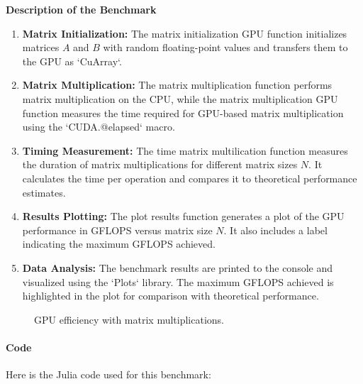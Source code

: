 \begin{center}
   \textbf{Description of the Benchmark}   
\end{center}

\begin{enumerate}
   \item \textbf{Matrix Initialization:} The matrix initialization GPU function initializes matrices \(A\) and \(B\) with random floating-point values and transfers them to the GPU as `CuArray`.
   \item \textbf{Matrix Multiplication:} The matrix multiplication function performs matrix multiplication on the CPU, while the matrix multiplication GPU function measures the time required for GPU-based matrix multiplication using the `CUDA.@elapsed` macro.
   \item \textbf{Timing Measurement:} The time matrix multilication function measures the duration of matrix multiplications for different matrix sizes \(N\). It calculates the time per operation and compares it to theoretical performance estimates.
   \item \textbf{Results Plotting:} The plot results function generates a plot of the GPU performance in GFLOPS versus matrix size \(N\). It also includes a label indicating the maximum GFLOPS achieved.
   \item \textbf{Data Analysis:} The benchmark results are printed to the console and visualized using the `Plots` library. The maximum GFLOPS achieved is highlighted in the plot for comparison with theoretical performance.
\end{enumerate}

\begin{figure}[h]
   \begin{center}
      
\end{center}
\caption{GPU efficiency with matrix multiplications.}
\label{}
\end{figure}
\newpage

\paragraph{Code}

Here is the Julia code used for this benchmark:

\begin{comment}
 
\end{comment}

